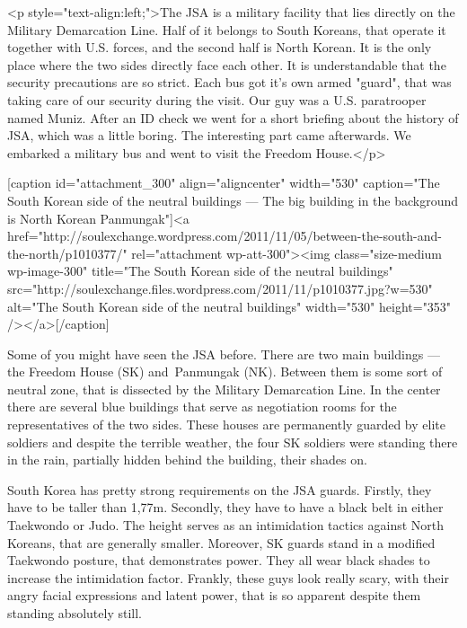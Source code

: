 \begin{post}
\begin{content}
<p style="text-align:left;">The JSA is a military facility that lies directly on the Military Demarcation Line. Half of it belongs to South Koreans, that operate it together with U.S. forces, and the second half is North Korean. It is the only place where the two sides directly face each other. It is understandable that the security precautions are so strict. Each bus got it's own armed "guard", that was taking care of our security during the visit. Our guy was a U.S. paratrooper named Muniz. After an ID check we went for a short briefing about the history of JSA, which was a little boring. The interesting part came afterwards. We embarked a military bus and went to visit the Freedom House.</p>





[caption id="attachment_300" align="aligncenter" width="530" caption="The South Korean side of the neutral buildings — The big building in the background is North Korean Panmungak"]<a href="http://soulexchange.wordpress.com/2011/11/05/between-the-south-and-the-north/p1010377/" rel="attachment wp-att-300"><img class="size-medium wp-image-300" title="The South Korean side of the neutral buildings" src="http://soulexchange.files.wordpress.com/2011/11/p1010377.jpg?w=530" alt="The South Korean side of the neutral buildings" width="530" height="353" /></a>[/caption]



Some of you might have seen the JSA before. There are two main buildings — the Freedom House (SK) and Panmungak (NK). Between them is some sort of neutral zone, that is dissected by the Military Demarcation Line. In the center there are several blue buildings that serve as negotiation rooms for the representatives of the two sides. These houses are permanently guarded by elite soldiers and despite the terrible weather, the four SK soldiers were standing there in the rain, partially hidden behind the building, their shades on.



South Korea has pretty strong requirements on the JSA guards. Firstly, they have to be taller than 1,77m. Secondly, they have to have a black belt in either Taekwondo or Judo. The height serves as an intimidation tactics against North Koreans, that are generally smaller. Moreover, SK guards stand in a modified Taekwondo posture, that demonstrates power. They all wear black shades to increase the intimidation factor. Frankly, these guys look really scary, with their angry facial expressions and latent power, that is so apparent despite them standing absolutely still.




\end{content}
\end{post}
